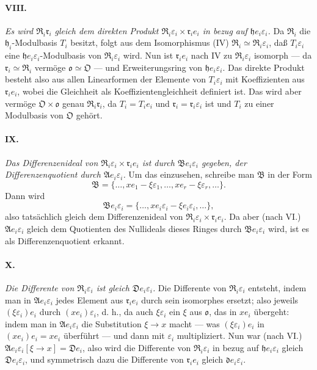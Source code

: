 \paragraph{VIII.}
\emph{Es wird $\mathfrak R_i\mathfrak r_i$ gleich dem direkten Produkt $\mathfrak R_i\varepsilon_i\times\mathfrak r_i e_i$ in bezug auf $\mathfrak h e_i\varepsilon_i$.} Da $\mathfrak R_i$ die $\mathfrak h_i$-Modulbasis $T_i$ besitzt, folgt aus dem Isomorphismus (IV) $\mathfrak R_i\simeq\mathfrak R_i\varepsilon_i$, daß $T_i\varepsilon_i$ eine $\mathfrak h e_i\varepsilon_i$-Modulbasis von $\mathfrak R_i\varepsilon_i$ wird. Nun ist $\mathfrak r_i e_i$ nach IV zu $\mathfrak R_i\varepsilon_i$ isomorph --- da $\mathfrak r_i\simeq\mathfrak R_i$ vermöge $\mathfrak o\simeq\mathfrak O$ --- und Erweiterungsring von $\mathfrak h e_i\varepsilon_i$. Das direkte Produkt besteht also aus allen Linearformen der Elemente von $T_i\varepsilon_i$ mit Koeffizienten aus $\mathfrak r_i e_i$, wobei die Gleichheit als Koeffizientengleichheit definiert ist. Das wird aber vermöge $\mathfrak O\times\mathfrak o$ genau $\mathfrak R_i\mathfrak r_i$, da $T_i=T_i e_i$ und $\mathfrak r_i=\mathfrak r_i\varepsilon_i$ ist und $T_i$ zu einer Modulbasis von $\mathfrak O$ gehört.

\paragraph{IX.}
\emph{Das Differenzenideal von $\mathfrak R_i\varepsilon_i\times\mathfrak r_i e_i$ ist durch $\mathfrak B e_i\varepsilon_i$ gegeben, der Differenzenquotient durch $\mathfrak A e_i\varepsilon_i$.} Um das einzusehen, schreibe man $\mathfrak B$ in der Form
\[
\mathfrak B=\{\ldots,xe_1-\xi\varepsilon_1,\ldots,xe_r-\xi\varepsilon_r,\ldots\}.
\]
Dann wird
\[
\mathfrak B e_i\varepsilon_i
=\{\ldots,xe_i\varepsilon_i-\xi e_i\varepsilon_i,\ldots\},
\]
also tatsächlich gleich dem Differenzenideal von $\mathfrak R_i\varepsilon_i\times\mathfrak r_i e_i$. Da aber (nach VI.) $\mathfrak A e_i\varepsilon_i$ gleich dem Quotienten des Nullideals dieses Ringes durch $\mathfrak B e_i\varepsilon_i$ wird, ist es als Differenzenquotient erkannt.

\paragraph{X.}
\emph{Die Differente von $\mathfrak R_i\varepsilon_i$ ist gleich $\mathfrak D e_i\varepsilon_i$.} Die Differente von $\mathfrak R_i\varepsilon_i$ entsteht, indem man in $\mathfrak A e_i\varepsilon_i$ jedes Element aus $\mathfrak r_i e_i$ durch sein isomorphes ersetzt; also jeweils $(\xi\varepsilon_i)e_i$ durch $(xe_i)\varepsilon_i$, d. h., da auch $\xi\varepsilon_i$ ein $\xi$ aus $\mathfrak o$, das in $xe_i$ übergeht: indem man in $\mathfrak A e_i\varepsilon_i$ die Substitution $\xi\to x$ macht --- was $(\xi\varepsilon_i)e_i$ in $(xe_i)e_i=xe_i$ überführt --- und dann mit $\varepsilon_i$ multipliziert. Nun war (nach VI.) $\mathfrak A e_i\varepsilon_i[\xi\to x]=\mathfrak D e_i$, also wird die Differente von $\mathfrak R_i\varepsilon_i$ in bezug auf $\mathfrak h e_i\varepsilon_i$ gleich $\mathfrak D e_i\varepsilon_i$, und symmetrisch dazu die Differente von $\mathfrak r_i e_i$ gleich $\mathfrak d e_i\varepsilon_i$.

